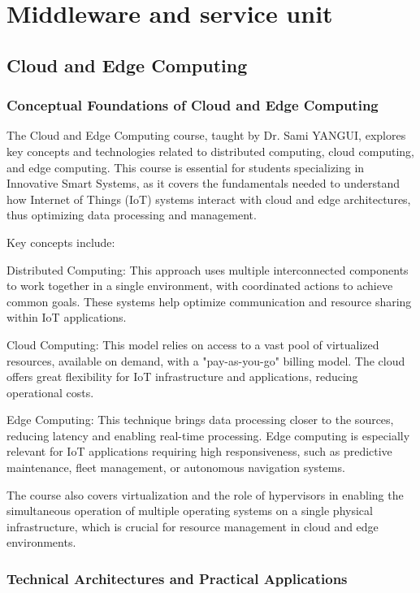 \chapter{Middleware and service unit }
\thispagestyle{fancy}


\section{Cloud and Edge Computing}
\subsection{Conceptual Foundations of Cloud and Edge Computing}


The Cloud and Edge Computing course, taught by Dr. Sami YANGUI, explores key concepts and technologies related to distributed computing, cloud computing, and edge computing. This course is essential for students specializing in Innovative Smart Systems, as it covers the fundamentals needed to understand how Internet of Things (IoT) systems interact with cloud and edge architectures, thus optimizing data processing and management.

Key concepts include:

Distributed Computing: This approach uses multiple interconnected components to work together in a single environment, with coordinated actions to achieve common goals. These systems help optimize communication and resource sharing within IoT applications.

Cloud Computing: This model relies on access to a vast pool of virtualized resources, available on demand, with a "pay-as-you-go" billing model. The cloud offers great flexibility for IoT infrastructure and applications, reducing operational costs.

Edge Computing: This technique brings data processing closer to the sources, reducing latency and enabling real-time processing. Edge computing is especially relevant for IoT applications requiring high responsiveness, such as predictive maintenance, fleet management, or autonomous navigation systems.

The course also covers virtualization and the role of hypervisors in enabling the simultaneous operation of multiple operating systems on a single physical infrastructure, which is crucial for resource management in cloud and edge environments.

\subsection{Technical Architectures and Practical Applications}

